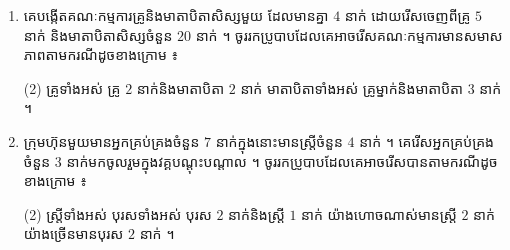 \begin{enumerate}[1]
  \item គេបង្កើតគណៈកម្មការគ្រូនិងមាតាបិតាសិស្សមួយ ដែលមានគ្នា $4$ នាក់ ដោយរើសចេញពីគ្រូ $5$ នាក់ និងមាតាបិតាសិស្សចំនួន $20$ នាក់ ។ ចូររកប្រូបាបដែលគេអាចរើសគណៈកម្មការមានសមាសភាពតាមករណីដូចខាងក្រោម ៖
  \begin{tasks}(2)
    \task គ្រូទាំងអស់
    \task គ្រូ $2$ នាក់និងមាតាបិតា $2$ នាក់
    \task មាតាបិតាទាំងអស់
    \task គ្រូម្នាក់និងមាតាបិតា $3$ នាក់ ។
  \end{tasks}
  \item ក្រុមហ៊ុនមួយមានអ្នកគ្រប់គ្រងចំនួន $7$ នាក់ក្នុងនោះមានស្ត្រីចំនួន $4$ នាក់ ។ គេរើសអ្នកគ្រប់គ្រងចំនួន $3$ នាក់មកចូលរួមក្នុងវគ្គបណ្ដុះបណ្ដាល ។ ចូររកប្រូបាបដែលគេអាចរើសបានតាមករណីដូចខាងក្រោម ៖
  \begin{tasks}(2)
    \task ស្ត្រីទាំងអស់
    \task បុរសទាំងអស់
    \task បុរស $2$ នាក់និងស្ត្រី $1$ នាក់
    \task យ៉ាងហោចណាស់មានស្ត្រី $2$ នាក់
    \task យ៉ាងច្រើនមានបុរស $2$ នាក់ ។
  \end{tasks}
\end{enumerate}

